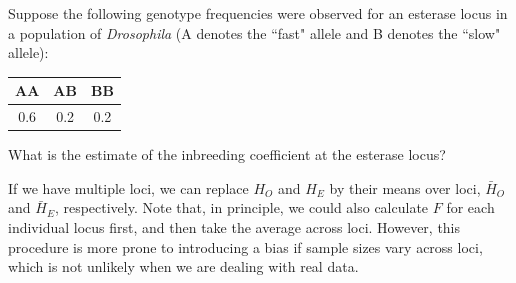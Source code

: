 \begin{question}{}
  Suppose the following genotype frequencies were observed for an esterase locus in a population of \textit{Drosophila} (A denotes the ``fast" allele and B denotes the ``slow" allele):
\begin{center}
\begin{tabular}{ccc}
\hline
AA &	AB &	BB\\
\hline
0.6 &	0.2 &	0.2\\
\end{tabular}
\end{center}
What is the estimate of the inbreeding coefficient at the esterase locus?
\end{question}

If we have multiple loci, we can replace $H_O$ and $H_E$ by their means
over loci, $\bar{H}_O$ and $\bar{H}_E$, respectively. Note that, in principle, we could also calculate $F$ for each individual locus first, and then take the average across loci. However, this procedure is more prone to introducing a bias if sample sizes vary across loci, which is not unlikely when we are dealing with real data.


